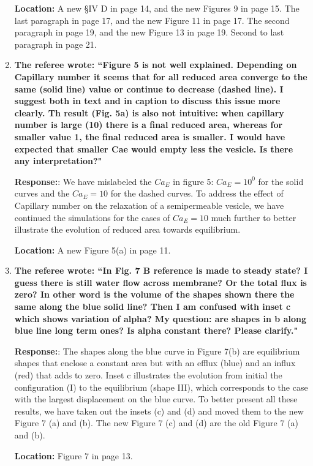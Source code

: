 \documentclass[12pt]{article}
\begin{document}
\begin{enumerate}
\noindent
{\bf Location:} A new \S IV D in page 14, and the new Figures 9 in page 15. The last paragraph in page 17, and the new Figure 11 in page 17. The second paragraph in page 19, and the new Figure 13 in page 19. Second to last paragraph in page 21.


\item {\bf 
The referee wrote:
``Figure 5 is not well explained. Depending on Capillary number it
seems that for all reduced area converge to the same (solid line)
value or continue to decrease (dashed line). I suggest both in text
and in caption to discuss this issue more clearly. Th result (Fig. 5a)
is also not intuitive: when capillary number is large (10) there is a
final reduced area, whereas for smaller value 1, the final reduced
area is smaller. I would have expected that smaller Cae would empty
less the vesicle. Is there any interpretation?"}

\noindent
{\bf Response:}: We have mislabeled the $Ca_E$ in figure 5:  $Ca_E=10^0$ for the solid curves and the $Ca_E=10$ for the dashed curves. To address the effect of Capillary number on the relaxation of a semipermeable vesicle, we have continued the simulations for the cases of $Ca_E = 10$ much further to better illustrate the evolution of reduced area towards equilibrium.

\noindent
{\bf Location:} A new Figure 5(a) in page 11.

\item{\bf
The referee wrote:
``In Fig. 7 B reference is made to steady state? I guess there is
still water flow across membrane? Or the total flux is zero? In other
word is the volume of the shapes shown there the same along the blue
solid line? Then I am confused with inset c which shows variation of
alpha? My question: are shapes in b along blue line long term ones? Is
alpha constant there? Please clarify."}

\noindent
{\bf Response:}: The shapes along the blue curve in Figure 7(b) are equilibrium shapes that enclose a constant area but with an efflux (blue) and an influx (red) that adds to zero. Inset c illustrates the evolution from initial  the configuration (I) to the equilibrium (shape III), which corresponds to the case with the largest displacement on the blue curve. To better present all these results, we have taken out the insets (c) and (d) and moved them to the new Figure 7 (a) and (b). The new Figure 7 (c) and (d) are the old Figure  7 (a) and (b).

\noindent
{\bf Location:} Figure 7 in page 13.


\end{enumerate}
\end{document}
